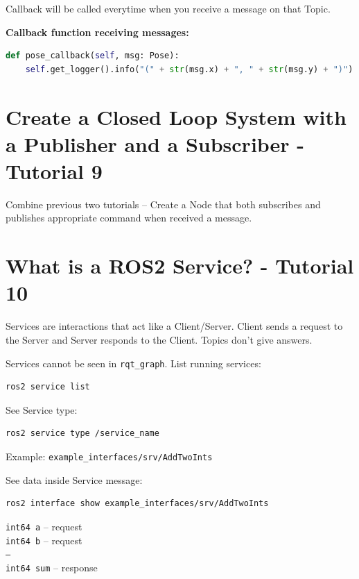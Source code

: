 \documentclass{article}
\newcommand{\code}[1]{\colorbox{codeBg}{\texttt{#1}}}
\begin{document}
\vspace{0.3cm}
\begin{notebox}
Callback will be called everytime when you receive a message on that Topic.
\end{notebox}

\vspace{0.3cm}
\noindent \textbf{Callback function receiving messages:}
\begin{lstlisting}[style=pythonStyle, language=Python]
def pose_callback(self, msg: Pose):
    self.get_logger().info("(" + str(msg.x) + ", " + str(msg.y) + ")")
\end{lstlisting}

\newpage

\section{Create a Closed Loop System with a Publisher and a Subscriber - Tutorial 9}

\vspace{0.3cm}
\noindent Combine previous two tutorials -- Create a Node that both subscribes and publishes appropriate command when received a message.

\newpage

\section{What is a ROS2 Service? - Tutorial 10}

\vspace{0.3cm}
\noindent Services are interactions that act like a Client/Server. Client sends a request to the Server and Server responds to the Client. Topics don't give answers.

\vspace{0.3cm}
\noindent Services cannot be seen in \code{rqt\_graph}. List running services:
\begin{lstlisting}[style=bashStyle, language=bash]
ros2 service list
\end{lstlisting}

\vspace{0.3cm}
\noindent See Service type:
\begin{lstlisting}[style=bashStyle, language=bash]
ros2 service type /service_name
\end{lstlisting}
Example: \code{example\_interfaces/srv/AddTwoInts}

\vspace{0.3cm}
\noindent See data inside Service message:
\begin{lstlisting}[style=bashStyle, language=bash]
ros2 interface show example_interfaces/srv/AddTwoInts
\end{lstlisting}
\code{int64 a} -- request \\
\code{int64 b} -- request \\
\code{---} \\
\code{int64 sum} -- response
\end{document}

